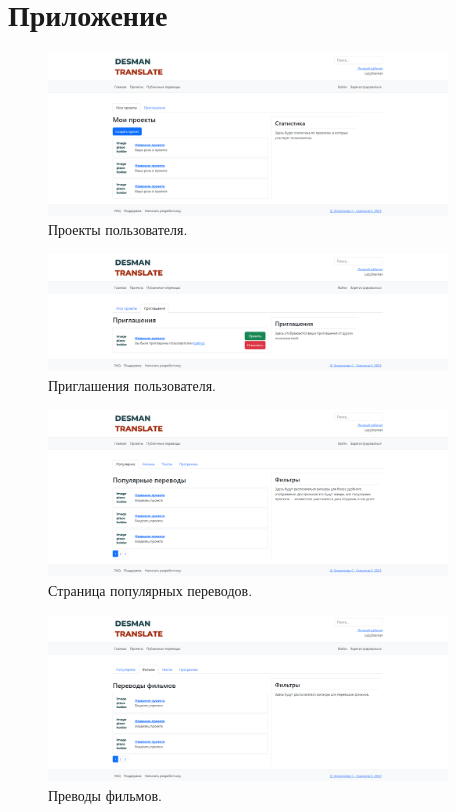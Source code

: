 \documentclass[a4paper,12pt]{article}
\begin{document}




\newpage
\section*{Приложение}

\begin{figure}[h]
\centering
\includegraphics[width=400px]{projects1.png}
\caption{Проекты пользователя.}
\label{fig:projects1}
\end{figure}

\begin{figure}[h]
\centering
\includegraphics[width=400px]{projects2.png}
\caption{Приглашения пользователя.}
\label{fig:projects2}
\end{figure}

\begin{figure}[h]
\centering
\includegraphics[width=400px]{public1.png}
\caption{Страница популярных переводов.}
\label{fig:public1}
\end{figure}

\begin{figure}[h]
\centering
\includegraphics[width=400px]{public2.png}
\caption{Преводы фильмов.}
\label{fig:public2}
\end{figure}
\end{document}
